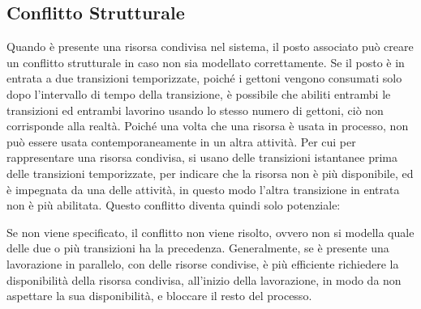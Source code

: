 \documentclass{article}
\numberwithin{equation}{subsection}
\begin{document}
\subsection{Conflitto Strutturale}

Quando è presente una risorsa condivisa nel sistema, il posto associato può creare un conflitto strutturale in caso non sia modellato correttamente. Se il posto è in entrata 
a due transizioni temporizzate, poiché i gettoni vengono consumati solo dopo l'intervallo di tempo della transizione, è possibile che abiliti entrambi le transizioni ed 
entrambi lavorino usando lo stesso numero di gettoni, ciò non corrisponde alla realtà. Poiché una volta che una risorsa è usata in processo, non può essere usata contemporaneamente 
in un altra attività. Per cui per rappresentare una risorsa condivisa, si usano delle transizioni istantanee prima delle transizioni temporizzate, per indicare che la 
risorsa non è più disponibile, ed è impegnata da una delle attività, in questo modo l'altra transizione in entrata non è più abilitata. Questo conflitto diventa quindi solo 
potenziale: 
\begin{center}
\end{center}

Se non viene specificato, il conflitto non viene risolto, ovvero non si modella quale delle due o più transizioni ha la precedenza. Generalmente, se è presente una 
lavorazione in parallelo, con delle risorse condivise, è più efficiente richiedere la disponibilità della risorsa condivisa, all'inizio della lavorazione, in modo da 
non aspettare la sua disponibilità, e bloccare il resto del processo. 
\end{document}
